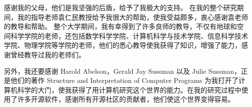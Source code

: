 \begin{acknowledgements}
  感谢我的父母，他们是我坚强的后盾，给予了我极大的支持。
  在我的整个研究期间，我的指导老师袁仁民教授给予我很大的帮助，使我受益颇多，衷心感谢袁老师的教导和帮助。
  整个大学期间，我有幸得到了许多良师的教导，不仅有地球和空间科学学院的老师，还包括数学科学学院、计算机科学与技术学院、信息科学技术学院、物理学院等学院的老师，他们的悉心教导使我获得了知识，增强了能力，感谢曾经教导过我的老师们。

  另外，我还要感谢 Harold Abelson，Gerald Jay Sussman 以及 Julie Sussman，正是他们的著作 Structure and Interpretation of Computer Programs 为我打开了计算机科学的大门，使我获得了用计算机研究这个世界的能力。在我的研究过程中使用了许多开源软件，感谢所有开源社区的贡献者，他们使这个世界变得容易。
\end{acknowledgements}
